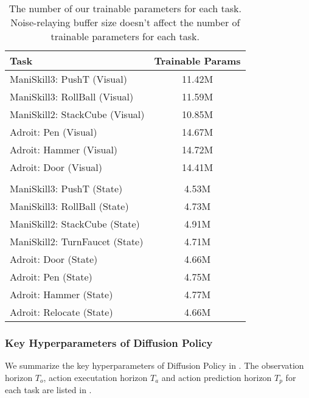 \begin{table}[!ht]
\caption{The number of our \ours trainable parameters for each task. Noise-relaying buffer size doesn't affect the number of trainable parameters for each task.}
\label{table:rnr_dp_trainable_parameters}
\setlength{\tabcolsep}{3.5pt}
\begin{center}
{{
\begin{tabular}{lc}
\toprule[1pt]
\textbf{Task}
& \textbf{Trainable Params}
\\
\midrule
ManiSkill3: PushT (Visual) & 11.42M \\
ManiSkill3: RollBall (Visual) & 11.59M \\
ManiSkill2: StackCube (Visual) & 10.85M \\
Adroit: Pen (Visual) & 14.67M \\
Adroit: Hammer (Visual) & 14.72M \\
Adroit: Door (Visual) & 14.41M \\
& \\
ManiSkill3: PushT (State) & 4.53M \\
ManiSkill3: RollBall (State) & 4.73M \\
ManiSkill2: StackCube (State) & 4.91M \\
ManiSkill2: TurnFaucet (State) & 4.71M \\
Adroit: Door (State) & 4.66M \\
Adroit: Pen (State) & 4.75M \\
Adroit: Hammer (State) & 4.77M \\
Adroit: Relocate (State) & 4.66M \\
\bottomrule[1pt]
\end{tabular}
}}
\end{center}
\vspace{-12pt}
\end{table}


\subsubsection{Key Hyperparameters of Diffusion Policy}
We summarize the key hyperparameters of Diffusion Policy in .
The observation horizon $T_o$, action executation horizon $T_a$ and action prediction horizon $T_p$ for each task are listed in .

